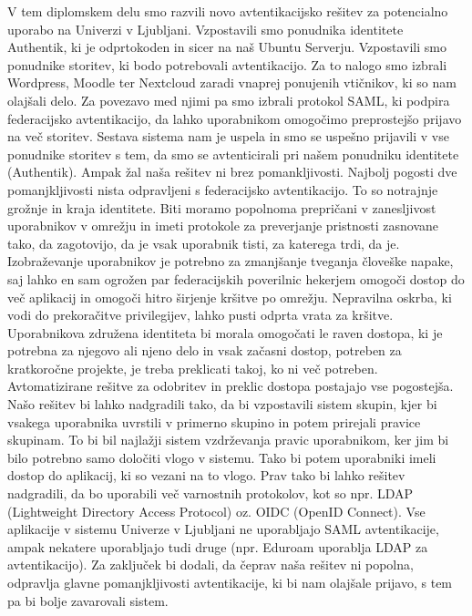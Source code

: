 \documentclass[a4paper,12pt,openright]{book}
\begin{document}
V tem diplomskem delu smo razvili novo avtentikacijsko rešitev za potencialno uporabo na Univerzi v Ljubljani. Vzpostavili smo ponudnika identitete Authentik, ki je odprtokoden in sicer na naš Ubuntu Serverju. Vzpostavili smo ponudnike storitev, ki bodo potrebovali avtentikacijo. Za to nalogo smo izbrali Wordpress, Moodle ter Nextcloud zaradi vnaprej ponujenih vtičnikov, ki so nam olajšali delo. Za povezavo med njimi pa smo izbrali protokol SAML, ki podpira federacijsko avtentikacijo, da lahko uporabnikom omogočimo preprostejšo prijavo na več storitev. 
\newline
Sestava sistema nam je uspela in smo se uspešno prijavili v vse ponudnike storitev s tem, da smo se avtenticirali pri našem ponudniku identitete (Authentik). 
\newline
Ampak žal naša rešitev ni brez pomankljivosti. Najbolj pogosti dve pomanjkljivosti nista odpravljeni s federacijsko avtentikacijo. To so notrajnje grožnje in kraja identitete. Biti moramo popolnoma prepričani v zanesljivost uporabnikov v omrežju in imeti protokole za preverjanje pristnosti zasnovane tako, da zagotovijo, da je vsak uporabnik tisti, za katerega trdi, da je. Izobraževanje uporabnikov je potrebno za zmanjšanje tveganja človeške napake, saj lahko en sam ogrožen par federacijskih poverilnic hekerjem omogoči dostop do več aplikacij in omogoči hitro širjenje kršitve po omrežju.
Nepravilna oskrba, ki vodi do prekoračitve privilegijev, lahko pusti odprta vrata za kršitve. Uporabnikova združena identiteta bi morala omogočati le raven dostopa, ki je potrebna za njegovo ali njeno delo in vsak začasni dostop, potreben za kratkoročne projekte, je treba preklicati takoj, ko ni več potreben. Avtomatizirane rešitve za odobritev in preklic dostopa postajajo vse pogostejša.
\newline
Našo rešitev bi lahko nadgradili tako, da bi vzpostavili sistem skupin, kjer bi vsakega uporabnika uvrstili v primerno skupino in potem prirejali pravice skupinam. To bi bil najlažji sistem vzdrževanja pravic uporabnikom, ker jim bi bilo potrebno samo določiti vlogo v sistemu. Tako bi potem uporabniki imeli dostop do aplikacij, ki so vezani na to vlogo. 
\newline
Prav tako bi lahko rešitev nadgradili, da bo uporabili več varnostnih protokolov, kot so npr. LDAP (Lightweight Directory Access Protocol) oz. OIDC (OpenID Connect). Vse aplikacije v sistemu Univerze v Ljubljani ne uporabljajo SAML avtentikacije, ampak nekatere uporabljajo tudi druge (npr. Eduroam uporablja LDAP za avtentikacijo). 
\newline
Za zaključek bi dodali, da čeprav naša rešitev ni popolna, odpravlja glavne pomanjkljivosti avtentikacije, ki bi nam olajšale prijavo, s tem pa bi bolje zavarovali sistem. 
\end{document}
